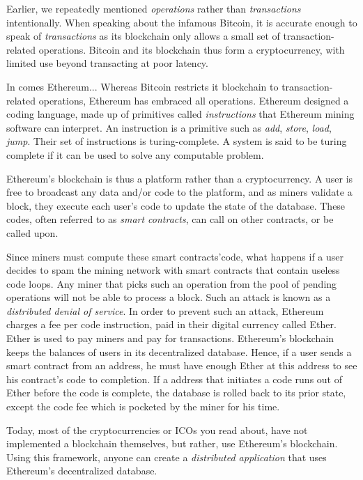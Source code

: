 Earlier, we repeatedly mentioned \emph{operations} rather than \emph{transactions} intentionally.
When speaking about the infamous Bitcoin, it is accurate enough to speak of \emph{transactions} as its blockchain
only allows a small set of transaction-related operations.
Bitcoin and its blockchain thus form a cryptocurrency, with limited use beyond transacting at poor latency.

In comes Ethereum...
Whereas Bitcoin restricts it blockchain to transaction-related operations, Ethereum has embraced all operations.
Ethereum designed a coding language, made up of primitives called \emph{instructions} that Ethereum mining software can interpret.
An instruction is a primitive such as \emph{add}, \emph{store}, \emph{load}, \emph{jump}. 
Their set of instructions is turing-complete.
A system is said to be turing complete if it can be used to solve any computable problem.

Ethereum's blockchain is thus a platform rather than a cryptocurrency.
A user is free to broadcast any data and/or code to the platform, and as miners validate a block,
they execute each user's code to update the state of the database.
These codes, often referred to as \emph{smart contracts}, can call on other contracts, or be called upon.

Since miners must compute these smart contracts'code, what happens if a user decides to spam the mining network with
smart contracts that contain useless code loops. 
Any miner that picks such an operation from the pool of pending operations will not be able to process a block.
Such an attack is known as a \emph{distributed denial of service}.
In order to prevent such an attack, Ethereum charges a fee per code instruction, paid in their digital currency called Ether.
Ether is used to pay miners and pay for transactions.
Ethereum's blockchain keeps the balances of users in its decentralized database.
Hence, if a user sends a smart contract from an address, he must have enough Ether at this address to see his contract's code
to completion.
If a address that initiates a code runs out of Ether before the code is complete, the database is rolled back to its prior
state, except the code fee which is pocketed by the miner for his time.

Today, most of the cryptocurrencies or ICOs you read about, have not implemented a blockchain themselves,
but rather, use Ethereum's blockchain.
Using this framework, anyone can create a \emph{distributed application} that uses Ethereum's decentralized database.

